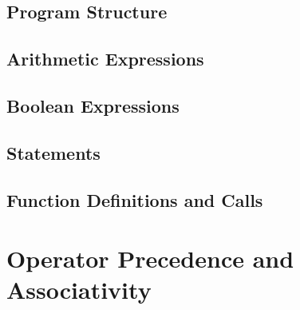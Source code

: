 \subsection{Program Structure}

\subsection{Arithmetic Expressions}

\subsection{Boolean Expressions}

\subsection{Statements}

\subsection{Function Definitions and Calls}

\section{Operator Precedence and Associativity}
